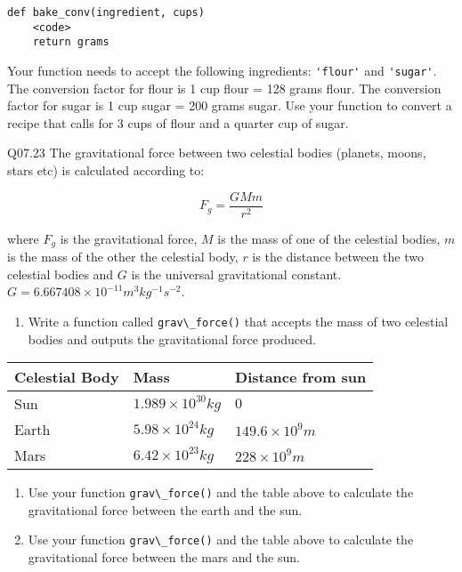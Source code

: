 \documentclass{book}
\providecommand{\tightlist}{%
      \setlength{\itemsep}{0pt}\setlength{\parskip}{0pt}}
\newcommand{\passthrough}[1]{#1}
\begin{document}
\begin{lstlisting}
def bake_conv(ingredient, cups)
    <code>
    return grams
\end{lstlisting}

Your function needs to accept the following ingredients:
\passthrough{\lstinline!'flour'!} and \passthrough{\lstinline!'sugar'!}.
The conversion factor for flour is 1 cup flour = 128 grams flour. The
conversion factor for sugar is 1 cup sugar = 200 grams sugar. Use your
function to convert a recipe that calls for 3 cups of flour and a
quarter cup of sugar.

Q07.23 The gravitational force between two celestial bodies (planets,
moons, stars etc) is calculated according to:

\[ F_g = \frac{GMm}{r^2} \]

where \(F_g\) is the gravitational force, \(M\) is the mass of one of
the celestial bodies, \(m\) is the mass of the other the celestial body,
\(r\) is the distance between the two celestial bodies and \(G\) is the
universal gravitational constant.
\(G=6.667408 \times 10^{-11} m^3 kg^{-1}s^{-2}\).

\begin{enumerate}
\def\labelenumi{(\alph{enumi})}
\tightlist
\item
  Write a function called \passthrough{\lstinline!grav\_force()!} that
  accepts the mass of two celestial bodies and outputs the gravitational
  force produced.
\end{enumerate}

\begin{longtable}[]{@{}lll@{}}
\toprule
Celestial Body & Mass & Distance from sun\tabularnewline
\midrule
\endhead
Sun & \(1.989\times10^{30} kg\) & \(0\)\tabularnewline
Earth & \(5.98\times10^{24} kg\) &
\(149.6 \times 10^9 m\)\tabularnewline
Mars & \(6.42\times10^{23} kg\) & \(228 \times 10^9 m\)\tabularnewline
\bottomrule
\end{longtable}

\begin{enumerate}
\def\labelenumi{(\alph{enumi})}
\setcounter{enumi}{1}
\item
  Use your function \passthrough{\lstinline!grav\_force()!} and the
  table above to calculate the gravitational force between the earth and
  the sun.
\item
  Use your function \passthrough{\lstinline!grav\_force()!} and the
  table above to calculate the gravitational force between the mars and
  the sun.
\end{enumerate}
\end{document}
